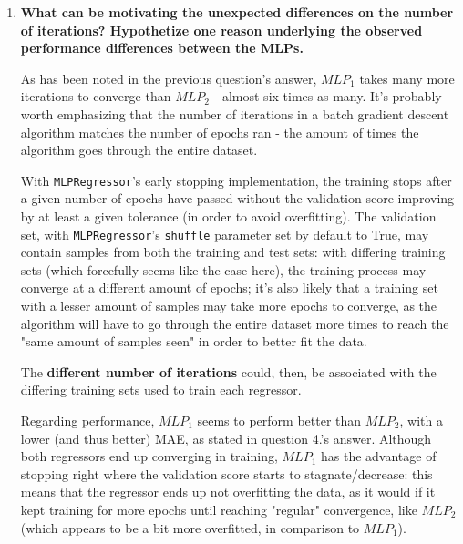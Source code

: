 \documentclass[12pt]{article}
\begin{document}
\begin{enumerate}[leftmargin=\labelsep,resume]
  \item \textbf{What can be motivating the unexpected differences on the number of iterations?
          Hypothetize one reason underlying the observed performance differences between the MLPs.}

        As has been noted in the previous question's answer, $MLP_1$ takes many more
        iterations to converge than $MLP_2$ - almost six times as many. It's probably
        worth emphasizing that the number of iterations in a batch gradient descent
        algorithm matches the number of epochs ran - the amount of times the algorithm goes
        through the entire dataset.

        With \texttt{MLPRegressor}'s early stopping implementation, the training stops
        after a given number of epochs have passed without the validation score
        improving by at least a given tolerance (in order to avoid overfitting).
        The validation set, with \texttt{MLPRegressor}'s \texttt{shuffle} parameter
        set by default to True, may contain samples from both the training and test sets:
        with differing training sets (which forcefully seems like the case here),
        the training process may converge at a different amount of epochs; it's
        also likely that a training set with a lesser amount of samples may
        take more epochs to converge, as the algorithm will have to go through
        the entire dataset more times to reach the "same amount of samples seen"
        in order to better fit the data.

        The \textbf{different number of iterations} could, then, be associated
        with the differing training sets used to train each regressor.

        Regarding performance, $MLP_1$ seems to perform better than $MLP_2$,
        with a lower (and thus better) MAE, as stated in question 4.'s answer.
        Although both regressors end up converging in training, $MLP_1$ has
        the advantage of stopping right where the validation score starts to
        stagnate/decrease: this means that the regressor ends up not overfitting
        the data, as it would if it kept training for more epochs until reaching
        "regular" convergence, like $MLP_2$ (which appears to be a bit more overfitted,
        in comparison to $MLP_1$).



\end{enumerate}
\end{document}
